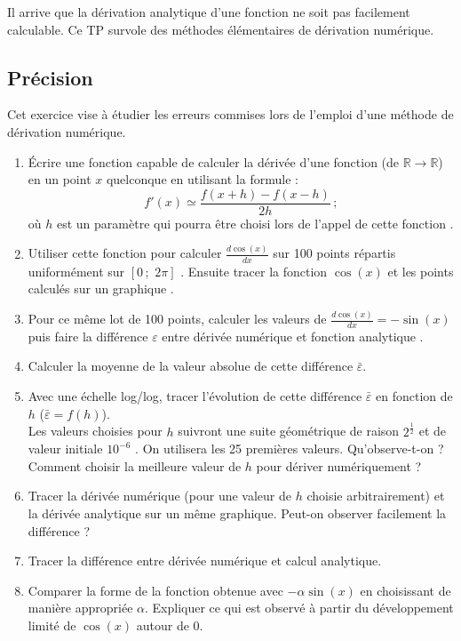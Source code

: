 Il  arrive que  la dérivation  analytique d'une  fonction ne  soit pas
facilement  calculable.  Ce TP  survole  des  méthodes élémentaires  de
dérivation numérique.

\subsection{Précision}
Cet exercice vise à étudier les erreurs commises lors de l'emploi d'une
méthode de dérivation numérique.
\begin{enumerate}
\item Écrire une fonction capable de calculer la dérivée d'une fonction
  (de  $\mathbb{R}  \longrightarrow  \mathbb{R}$)   en  un  point  $x$
  quelconque en utilisant la formule :
  $$f'(x) \simeq \frac{f(x+h)-f(x-h)}{2h}\,;$$  où $h$ est un  paramètre qui
  pourra   être   choisi   lors   de   l'appel   de   cette   fonction
  .  %
\item Utiliser cette fonction  pour calculer $\frac{d\cos(x)}{dx}$ sur
  100 points répartis uniformément sur $[0\,;\,\,2\pi]$ .
  Ensuite tracer la  fonction $\cos(x)$ et les points  calculés sur un
  graphique .  %
\item   Pour ce même lot de 100   points,  calculer   les  valeurs   de
  $\frac{d\cos(x)}{dx}   =   -\sin(x)$   puis  faire   la   différence
  $\varepsilon$ entre dérivée numérique et fonction analytique %
.
\item Calculer  la moyenne  de la valeur  absolue de  cette différence
  $\bar{\varepsilon}$.  %
\item Avec  une échelle  log/log, tracer  l'évolution de  cette différence
  $\bar{\varepsilon}$         en        fonction         de        $h$
  ($\bar{\varepsilon}=f(h)$).\\ Les valeurs choisies pour $h$ suivront
  une  suite  géométrique  de  raison  $2^\frac{1}{2}$  et  de  valeur
  initiale  $10^{-6}$ .   On  utilisera  les 25  premières
  valeurs.  Qu'observe-t-on ?  Comment  choisir la meilleure valeur de
  $h$ pour dériver numériquement ?
\item  Tracer la  dérivée numérique  (pour une  valeur de  $h$ choisie
  arbitrairement)   et    la   dérivée   analytique   sur    un   même
  graphique. Peut-on observer facilement la différence ?
\item  Tracer   la  différence   entre  dérivée  numérique   et  calcul
  analytique.
\item Comparer la forme de  la fonction obtenue avec $-\alpha \sin(x)$
  en choisissant de manière appropriée $\alpha$.  Expliquer ce qui est
  observé à partir du développement limité de $\cos(x)$ autour de $0$.
\end{enumerate}

